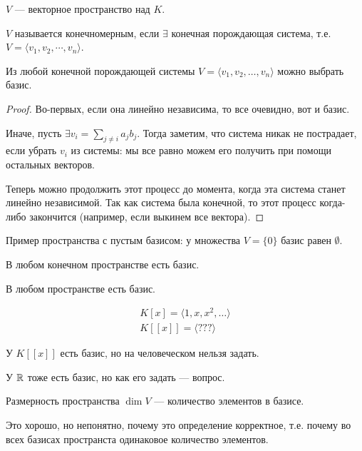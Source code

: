 \begin{definition}
    $V$ --- векторное пространство над  $K$.

    $V$ называется конечномерным, если  $\exists$ конечная порождающая система, т.е. $V = \langle v_1, v_2, \cdots, v_n \rangle$.
\end{definition}
\begin{lemma}
    Из любой конечной порождающей системы $V = \langle v_1, v_2, \ldots, v_n \rangle$ можно выбрать базис.
\end{lemma}
\begin{proof}
    Во-первых, если она линейно независима, то все очевидно, вот и базис.

    Иначе, пусть $\exists v_i = \sum\limits_{j \neq i}a_j b_j$. Тогда заметим, что система никак не пострадает, если убрать $v_i$ из системы: мы все равно можем его получить при помощи остальных векторов. 

    Теперь можно продолжить этот процесс до момента, когда эта система станет линейно независимой. Так как система была конечной, то этот процесс когда-либо закончится (например, если выкинем все вектора).
\end{proof}

\begin{remark}
    Пример пространства с пустым базисом: у множества $V = \{ 0 \}$ базис равен  $\emptyset$.
\end{remark}
\begin{consequence}
    В любом конечном пространстве есть базис.
\end{consequence}
\begin{remark}
    В любом пространстве есть базис.
\end{remark}
\begin{example}
    \begin{align*}
        K[x] = \langle 1, x, x^2,  \ldots \rangle \\
        K[[x]] = \langle ??? \rangle
    \end{align*}

    У $K[[x]]$ есть базис, но на человеческом нельзя задать.
    
    У $\mathbb{R}$ тоже есть базис, но как его задать --- вопрос.
\end{example}
\begin{definition}
    Размерность пространства $\dim V$ --- количество элементов в базисе.
\end{definition}

Это хорошо, но непонятно, почему это определение корректное, т.е. почему во всех базисах пространста одинаковое количество элементов.


